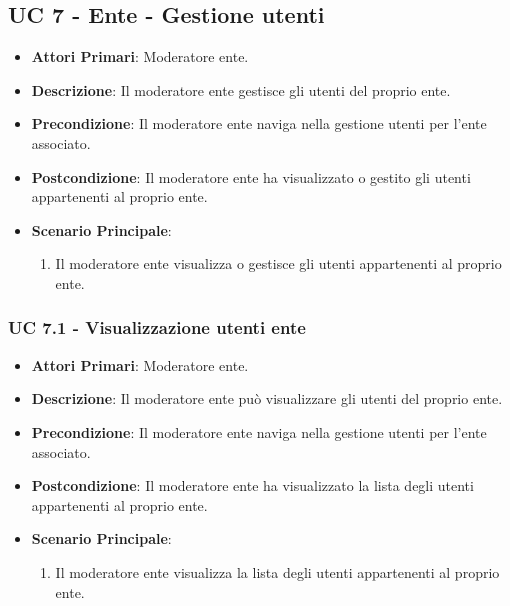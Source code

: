 	\subsection{UC 7 - Ente - Gestione utenti}
		
		\begin{itemize}
			\item \textbf{Attori Primari}: Moderatore ente.
			\item \textbf{Descrizione}: Il moderatore ente gestisce gli utenti del proprio ente.
			\item \textbf{Precondizione}: Il moderatore ente naviga nella gestione utenti per l'ente associato.
			\item \textbf{Postcondizione}: Il moderatore ente ha visualizzato o gestito gli utenti appartenenti al proprio ente.
			\item \textbf{Scenario Principale}:
			\begin{enumerate}
				\item{Il moderatore ente visualizza o gestisce gli utenti appartenenti al proprio ente.}
			\end{enumerate}	
		\end{itemize}
			
			\subsubsection{UC 7.1 - Visualizzazione utenti ente}
			\begin{itemize}
				\item \textbf{Attori Primari}: Moderatore ente.
				\item \textbf{Descrizione}: Il moderatore ente può visualizzare gli utenti del proprio ente.
				\item \textbf{Precondizione}: Il moderatore ente naviga nella gestione utenti per l'ente associato.
				\item \textbf{Postcondizione}: Il moderatore ente ha visualizzato la lista degli utenti appartenenti al proprio ente.
				\item \textbf{Scenario Principale}:
				\begin{enumerate}
					\item{Il moderatore ente visualizza la lista degli utenti appartenenti al proprio ente.}
				\end{enumerate}	
			\end{itemize}
			

